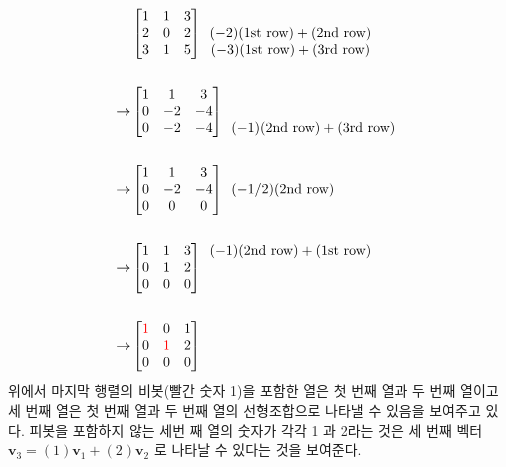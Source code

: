 \documentclass[
  11pt,
  a4paper,
  oneside]{scrbook}
\theoremstyle{definition}
\theoremstyle{definition}
\theoremstyle{plain}
\theoremstyle{remark}
\begin{document}
\[
\begin{aligned}
& 
\begin{bmatrix}
1 & 1 & 3 \\
2 & 0 & 2 \\
3 & 1 & 5 \\
\end{bmatrix}
\begin{array}{c}
\\
(-2)(\text{1st row}) + (\text{2nd row}) \\
(-3)(\text{1st row}) + (\text{3rd row}) 
\end{array} \\
& \\
\rightarrow
& 
\begin{bmatrix}
1 & 1 & 3 \\
0 & -2 & -4 \\
0 & -2 & -4  \\
\end{bmatrix}
\begin{array}{c}
\\
\\
(-1)(\text{2nd row}) + (\text{3rd row}) 
\end{array} \\
& \\
\rightarrow
& 
\begin{bmatrix}
1 & 1 & 3 \\
0 & -2 & -4 \\
0 & 0 & 0  \\
\end{bmatrix}
\begin{array}{c}
\\
(-1/2)(\text{2nd row})  \\
\\
\end{array} \\
& \\
\rightarrow
& 
\begin{bmatrix}
1 & 1 & 3\\
0 & 1 & 2\\
0 & 0 & 0 \\
\end{bmatrix}
\begin{array}{c}
(-1)(\text{2nd row}) + (\text{1st row})  \\
\\
\\
\end{array} \\
& \\
\rightarrow
& 
\begin{bmatrix}
\color{red}{1} & 0 & 1\\
0 & \color{red}{1} & 2\\
0 & 0 & 0 \\
\end{bmatrix}
\end{aligned}
\] 위에서 마지막 행렬의 비봇(빨간 숫자 1)을 포함한 열은 첫 번째 열과 두
번째 열이고 세 번째 열은 첫 번째 열과 두 번째 열의 선형조합으로 나타낼
수 있음을 보여주고 있다. 피봇을 포함하지 않는 세번 째 열의 숫자가 각각 1
과 2라는 것은 세 번째 벡터 \(\pmb v_3=(1)\pmb v_1 + (2) \pmb v_2\) 로
나타날 수 있다는 것을 보여준다.
\end{document}
